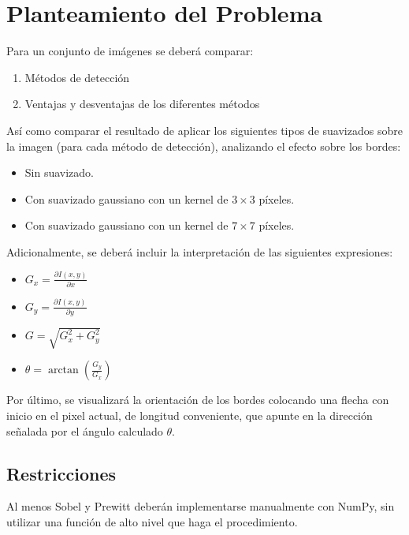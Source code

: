 \section{Planteamiento del Problema}
    Para un conjunto de imágenes se deberá comparar:
    \begin{enumerate}
        \item Métodos de detección
        \item Ventajas y desventajas de los diferentes métodos
    \end{enumerate}
    Así como comparar el resultado de aplicar los siguientes 
    tipos de suavizados sobre la imagen (para cada método de 
    detección), analizando el efecto sobre los bordes:
    \begin{itemize}
        \item Sin suavizado.
        \item Con suavizado gaussiano con un kernel de $3\times3$ píxeles.
        \item Con suavizado gaussiano con un kernel de $7\times7$ píxeles.
    \end{itemize}

    Adicionalmente, se deberá incluir la interpretación de las 
    siguientes expresiones:
    \begin{itemize}
        \item $G_x = \frac{\partial I(x, y)}{\partial x}$
        \item $G_y = \frac{\partial I(x, y)}{\partial y}$
        \item $G = \sqrt{G_x^2+G_y^2}$
        \item $\theta = \arctan(\frac{G_y}{G_x})$
    \end{itemize}

    Por último, se visualizará la orientación de los bordes colocando 
    una flecha con inicio en el pixel actual, de longitud conveniente, 
    que apunte en la dirección señalada por el ángulo calculado $\theta$.

    \subsection{Restricciones}
        Al menos Sobel y Prewitt deberán implementarse manualmente con 
        NumPy, sin utilizar una función de alto nivel que haga el 
        procedimiento.